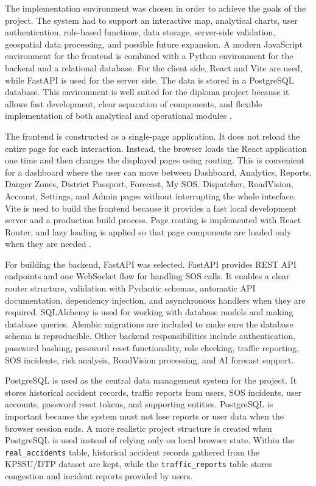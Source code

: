 ﻿\documentclass[12pt,a4paper]{report}
\begin{document}
The implementation environment was chosen in order to achieve the goals of the project. The system had to support an interactive map, analytical charts, user authentication, role-based functions, data storage, server-side validation, geospatial data processing, and possible future expansion. A modern JavaScript environment for the frontend is combined with a Python environment for the backend and a relational database. For the client side, React and Vite are used, while FastAPI is used for the server side. The data is stored in a PostgreSQL database. This environment is well suited for the diploma project because it allows fast development, clear separation of components, and flexible implementation of both analytical and operational modules \cite{chen2012}.

The frontend is constructed as a single-page application. It does not reload the entire page for each interaction. Instead, the browser loads the React application one time and then changes the displayed pages using routing. This is convenient for a dashboard where the user can move between Dashboard, Analytics, Reports, Danger Zones, District Passport, Forecast, My SOS, Dispatcher, RoadVision, Account, Settings, and Admin pages without interrupting the whole interface. Vite is used to build the frontend because it provides a fast local development server and a production build process. Page routing is implemented with React Router, and lazy loading is applied so that page components are loaded only when they are needed \cite{few2006}.

For building the backend, FastAPI was selected. FastAPI provides REST API endpoints and one WebSocket flow for handling SOS calls. It enables a clear router structure, validation with Pydantic schemas, automatic API documentation, dependency injection, and asynchronous handlers when they are required. SQLAlchemy is used for working with database models and making database queries. Alembic migrations are included to make sure the database schema is reproducible. Other backend responsibilities include authentication, password hashing, password reset functionality, role checking, traffic reporting, SOS incidents, risk analysis, RoadVision processing, and AI forecast support.

PostgreSQL is used as the central data management system for the project. It stores historical accident records, traffic reports from users, SOS incidents, user accounts, password reset tokens, and supporting entities. PostgreSQL is important because the system must not lose reports or user data when the browser session ends. A more realistic project structure is created when PostgreSQL is used instead of relying only on local browser state. Within the \texttt{real\_accidents} table, historical accident records gathered from the KPSSU/DTP dataset are kept, while the \texttt{traffic\_reports} table stores congestion and incident reports provided by users.
\end{document}
